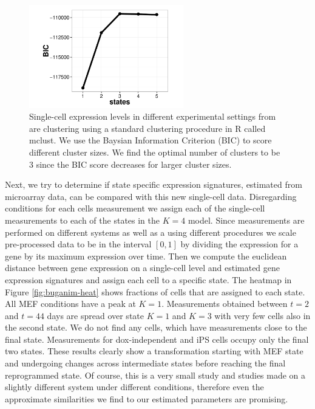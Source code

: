 \begin{figure}[!t]
  \centering
  \includegraphics[width=0.6\textwidth]{pics/yossi_mclust.pdf}
  \caption{Single-cell expression levels in different experimental settings from \cite{Buganim:2012hp} are clustering using a standard clustering procedure in R called mclust. We use the Baysian Information Criterion (BIC) to score different cluster sizes. We find the optimal number of clusters to be $3$ since the BIC score decreases for larger cluster sizes.}
  \label{fig:buganim-mclust}
\end{figure}

Next, we try to determine if state specific expression signatures, estimated from microarray data, can be compared with this new single-cell data. Disregarding conditions for each cells measurement we assign each of the single-cell measurements to each of the states in the $K=4$ model. Since measurements are performed on different systems as well as a using different procedures we scale pre-processed data to be in the interval $[0, 1]$ by dividing the expression for a gene by its maximum expression over time. Then we compute the euclidean distance between gene expression on a single-cell level and estimated gene expression signatures and assign each cell to a specific state. The heatmap in Figure \ref{fig:buganim-heat} shows fractions of cells that are assigned to each state. All MEF conditions have a peak at $K=1$. Measurements obtained between $t=2$ and $t=44$ days are spread over state $K=1$ and $K=3$ with very few cells also in the second state. We do not find any cells, which have measurements close to the final state. Measurements for dox-independent and iPS cells occupy only the final two states. These results clearly show a transformation starting with MEF state and undergoing changes across intermediate states before reaching the final reprogrammed state. Of course, this is a very small study and studies made on a slightly different system under different conditions, therefore even the approximate similarities we find to our estimated parameters are promising.


